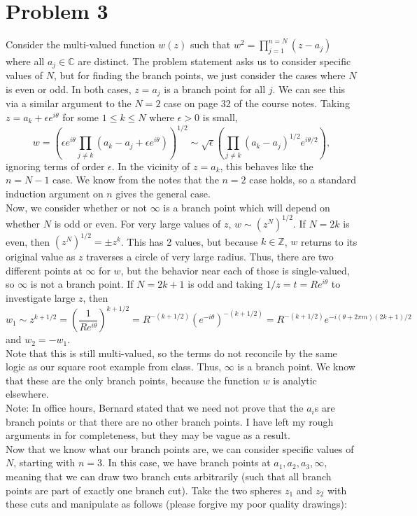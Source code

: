 \documentclass{article}
\begin{document}
\section{Problem 3 }
Consider the multi-valued function $w(z)$ such that $w^2=\prod_{j=1}^{n=N}(z-a_j)$ where all $a_j\in\mathbb{C}$ are distinct. The problem statement asks us to consider specific values of $N$, but for finding the branch points, we just consider the cases where $N$ is even or odd. In both cases, $z=a_j$ is a branch point for all $j$. We can see this via a similar argument to the $N=2$ case on page 32 of the course notes. Taking $z=a_k+\epsilon e^{i\theta}$ for some $1\leq k\leq N$ where $\epsilon>0$ is small,  
\[
w=(\epsilon e^{i\theta}\prod_{j\neq k}(a_k-a_j+\epsilon e^{i\theta}))^{1/2}\sim \sqrt{\epsilon}(\prod_{j\neq k}(a_k-a_j)^{1/2}e^{i\theta/2}),
\]
ignoring terms of order $\epsilon$. In the vicinity of $z=a_k$, this behaves like the $n=N-1$ case. We know from the notes that the $n=2$ case holds, so a standard induction argument on $n$ gives the general case. \\
Now, we consider whether or not $\infty$ is a branch point which will depend on whether $N$ is odd or even. For very large values of $z$, $w\sim (z^N)^{1/2}$. If $N=2k$ is even, then $(z^N)^{1/2}=\pm z^k$. This has 2 values, but because $k\in\mathbb{Z}$, $w$ returns to its original value as $z$ traverses a circle of very large radius. Thus, there are two different points at $\infty$ for $w$, but
the behavior near each of those is single-valued, so $\infty$ is not a branch point. If $N=2k+1$ is odd and taking $1/z=t=Re^{i\theta}$ to investigate large $z$, then
\[
w_1\sim z^{k+1/2}=(\frac{1}{Re^{i\theta}})^{k+1/2}=R^{-(k+1/2)}(e^{-i\theta})^{-(k+1/2)}=R^{-(k+1/2)}e^{-i(\theta+2\pi m)(2k+1)/2}
\]
and $w_2=-w_1$. \\
Note that this is still multi-valued, so the terms do not reconcile by the same logic as our square root example from class. Thus, $\infty$ is a branch point. We know that these are the only branch points, because the function $w$ is analytic elsewhere. \\ 
Note: In office hours, Bernard stated that we need not prove that the $a_i$s are branch points or that there are no other branch points. I have left my rough arguments in for completeness, but they may be vague as a result. \\
Now that we know what our branch points are, we can consider specific values of $N$, starting with $n=3$. In this case, we have branch points at $a_1, a_2, a_3, \infty$, meaning that we can draw two branch cuts arbitrarily (such that all branch points are part of exactly one branch cut). Take the two spheres $z_1$ and $z_2$ with these cuts and manipulate as follows (please forgive my poor quality drawings):\\
\end{document}
